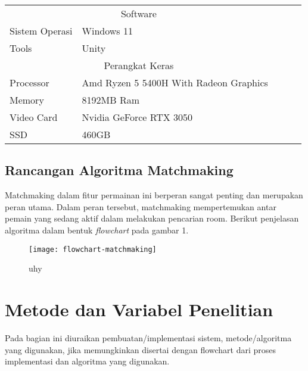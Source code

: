     \begin{table}[h]
        \centering
        \begin{tabular}{|ll|lll}
        \cline{1-2}
        \multicolumn{2}{|c|}{Software}                                                &  &  &  \\ \cline{1-2}
        \multicolumn{1}{|l|}{Sistem Operasi} & Windows 11                             &  &  &  \\ \cline{1-2}
        \multicolumn{1}{|l|}{Tools}          & Unity                                  &  &  &  \\ \cline{1-2}
        \multicolumn{2}{|c|}{Perangkat Keras}                                         &  &  &  \\ \cline{1-2}
        \multicolumn{1}{|l|}{Processor}      & Amd Ryzen 5 5400H With Radeon Graphics &  &  &  \\ \cline{1-2}
        \multicolumn{1}{|l|}{Memory}         & 8192MB Ram                             &  &  &  \\ \cline{1-2}
        \multicolumn{1}{|l|}{Video Card}     & Nvidia GeForce RTX 3050                &  &  &  \\ \cline{1-2}
        \multicolumn{1}{|l|}{SSD}            & 460GB                                  &  &  &  \\ \cline{1-2}
        \end{tabular}
        \end{table}
\subsection{Rancangan Algoritma Matchmaking}
Matchmaking dalam fitur permainan ini berperan sangat penting dan merupakan peran utama. Dalam peran tersebut, matchmaking mempertemukan antar pemain yang sedang aktif dalam melakukan pencarian room. Berikut penjelasan algoritma dalam bentuk \textit{flowchart} pada gambar 1.
\begin{figure}[h]
    \centering
    \caption{uhy}
    \texttt{[image: flowchart-matchmaking]}
    \label{tb:uhuy}
    \end{figure}
\section{Metode dan Variabel Penelitian}
Pada bagian ini diuraikan pembuatan/implementasi sistem,   metode/algoritma yang digunakan, jika memungkinkan disertai dengan flowchart dari proses implementasi dan algoritma yang digunakan.

